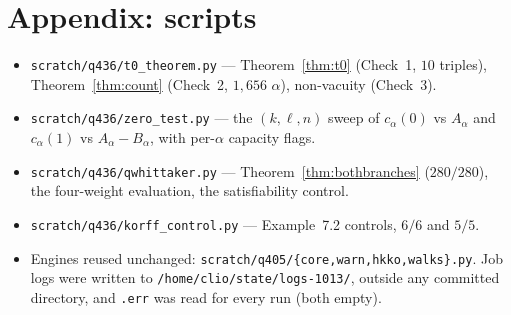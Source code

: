 \documentclass[11pt]{article}
\theoremstyle{plain}
\theoremstyle{definition}
\begin{document}
\section*{Appendix: scripts}

\begin{itemize}
\item \texttt{scratch/q436/t0\_theorem.py} --- Theorem~\ref{thm:t0} (Check~1, $10$ triples),
Theorem~\ref{thm:count} (Check~2, $1{,}656$ $\alpha$), non-vacuity (Check~3).
\item \texttt{scratch/q436/zero\_test.py} --- the $(k,\ell,n)$ sweep of $c_\alpha(0)$ vs
$A_\alpha$ and $c_\alpha(1)$ vs $A_\alpha-B_\alpha$, with per-$\alpha$ capacity flags.
\item \texttt{scratch/q436/qwhittaker.py} --- Theorem~\ref{thm:bothbranches} ($280/280$),
the four-weight evaluation, the satisfiability control.
\item \texttt{scratch/q436/korff\_control.py} --- Example~7.2 controls, $6/6$ and $5/5$.
\item Engines reused unchanged: \texttt{scratch/q405/\{core,warn,hkko,walks\}.py}.
Job logs were written to \texttt{/home/clio/state/logs-1013/}, outside any committed
directory, and \texttt{.err} was read for every run (both empty).
\end{itemize}
\end{document}
